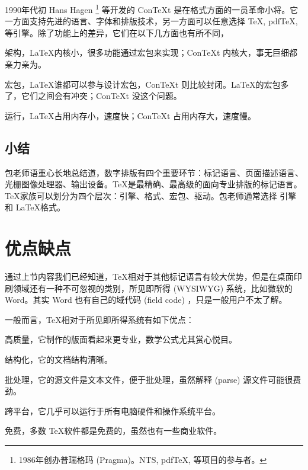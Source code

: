1990年代初 Hans Hagen\indexHagen{} \footnote{1986年创办普瑞格玛 (Pragma)\indexPragma。NTS, pdfTeX, \LuaTeX 等项目的参与者。} 等开发的 Con\TeX t 是在格式方面的一员革命小将。它一方面支持先进的语言、字体和排版技术，另一方面可以任意选择 \TeX, pdfTeX, \LuaTeX 等引擎。除了功能上的差异，它们在以下几方面也有所不同，

\begin{compactitem}
    \item 架构，\LaTeX 内核小，很多功能通过宏包来实现；Con\TeX t 内核大，事无巨细都亲力亲为。
    \item 宏包，\LaTeX 谁都可以参与设计宏包，Con\TeX t 则比较封闭。\LaTeX 的宏包多了，它们之间会有冲突；Con\TeX t 没这个问题。
    \item 运行，\LaTeX 占用内存小，速度快；Con\TeX t 占用内存大，速度慢。
\end{compactitem}

\subsection{小结}

包老师语重心长地总结道，数字排版有四个重要环节：标记语言、页面描述语言、光栅图像处理器、输出设备。\TeX 是最精确、最高级的面向专业排版的标记语言。\TeX 家族可以划分为四个层次：引擎、格式、宏包、驱动。包老师通常选择 \XeTeX 引擎和 \LaTeX 格式。

\section{优点缺点}

通过上节内容我们已经知道，\TeX 相对于其他标记语言有较大优势，但是在桌面印刷领域还有一种不可忽视的类别，所见即所得 (WYSIWYG) 系统，比如微软\indexMSFT{}的 Word。其实 Word 也有自己的域代码 (field code) ，只是一般用户不太了解。

一般而言，\TeX 相对于所见即所得系统有如下优点：
\begin{compactitem}
   \item 高质量，它制作的版面看起来更专业，数学公式尤其赏心悦目。
   \item 结构化，它的文档结构清晰。
   \item 批处理，它的源文件是文本文件，便于批处理，虽然解释 (parse) 源文件可能很费劲。
   \item 跨平台，它几乎可以运行于所有电脑硬件和操作系统平台。
   \item 免费，多数 \TeX 软件都是免费的，虽然也有一些商业软件。
\end{compactitem}


